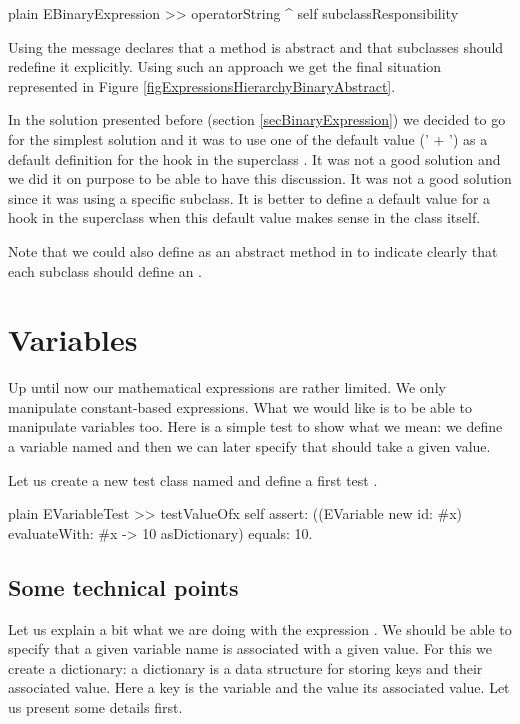\documentclass[10pt,twoside,english]{_support/latex/sbabook/sbabook}
\begin{document}
\begin{displaycode}{plain}
EBinaryExpression >> operatorString
	^ self subclassResponsibility
\end{displaycode}

Using the message  declares that a method is abstract and that subclasses should redefine it explicitly. 
Using such an approach we get the final situation represented in Figure \ref{figExpressionsHierarchyBinaryAbstract}. 

In the solution presented before (section \ref{secBinaryExpression}) we decided to go for the simplest solution and it was to use one of the default value (' + ') as a default definition for the hook in the superclass .  It was not a good solution and we did it on purpose to be able to have this discussion. It was not a good solution since it was using a specific subclass. It is better to define a default value for a hook in the superclass when this default value makes sense in the class itself.

Note that we could also define  as an abstract method in  to indicate clearly that each subclass should 
define an .
\section{Variables}
Up until now our mathematical expressions are rather limited. We only manipulate constant-based expressions. What we would like is to be able to manipulate variables too. 
Here is a simple test to show what we mean: we define a variable named  and then we can later specify that  should take a given value. 

Let us create a new test class named  and define a first test .

\begin{displaycode}{plain}
EVariableTest >> testValueOfx
	self assert: ((EVariable new id: #x) evaluateWith: {#x -> 10} asDictionary) equals: 10.
\end{displaycode}
\subsection{Some technical points}
Let us explain a bit what we are doing with the expression . We should be able to specify that a given variable name is associated with a given value. For this we create a dictionary: a dictionary is a data structure for storing keys and their associated value. Here a key is the variable and the value its associated value. Let us present some details first.
\end{document}
